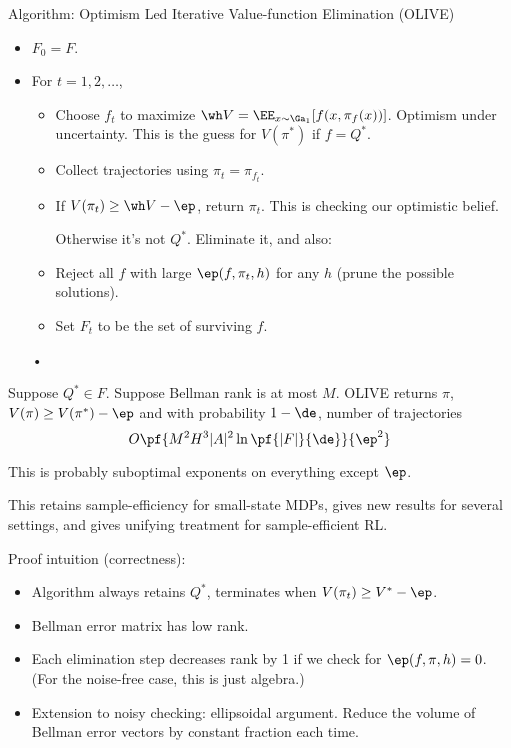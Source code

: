 Algorithm: Optimism Led Iterative Value-function Elimination (OLIVE)
\begin{itemize}
\item
$F_0=F$.
\item
For $t=1,2,\ldots$,
\begin{itemize}
\item
Choose $f_t$ to maximize $\wh V = \EE_{x\sim \Ga_1} [f(x,\pi_f(x))]$. Optimism under uncertainty. This is the guess for $V(\pi^*)$ if $f=Q^*$.
\item
Collect trajectories using $\pi_t=\pi_{f_t}$.
\item
If $V(\pi_t) \ge \wh V-\ep$, return $\pi_t$. This is checking our optimistic belief.

Otherwise it's not $Q^*$.  Eliminate it, and also:
\item
Reject all $f$ with large $\ep(f,\pi_t,h)$ for any $h$ (prune the possible solutions).
\item
Set $F_t$ to be the set of surviving $f$.
\end{itemize}•
\end{itemize}

\begin{thm}
Suppose $Q^*\in F$. 
Suppose Bellman rank is at most $M$. OLIVE returns $\pi$, $V(\pi)\ge V(\pi^*)-\ep$ and with probability $1-\de$, number of trajectories
$$
O\pf{M^2H^3|A|^2\ln \pf{|F|}{\de}}{\ep^{2}}
$$
\end{thm}
This is probably suboptimal exponents on everything except $\ep$.

This retains sample-efficiency for small-state MDPs, gives new results for several settings, and gives unifying treatment for sample-efficient RL.


Proof intuition (correctness):
\begin{itemize}
\item
Algorithm always retains $Q^*$, terminates when $V(\pi_t)\ge V^*-\ep$. %
\item
Bellman error matrix has low rank.
\item
Each elimination step decreases rank by 1 if we check for $\ep(f,\pi,h)=0$. (For the noise-free case, this is just algebra.)
\item
Extension to noisy checking: ellipsoidal argument. Reduce the volume of Bellman error vectors by constant fraction each time.
\end{itemize}


